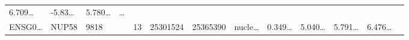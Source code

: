 \documentclass[
]{article}
\begin{document}
\begin{longtable}[]{@{}lllllllllllll@{}}
\begin{minipage}[t]{0.05\columnwidth}
6.709\ldots{}\strut
\end{minipage} & \begin{minipage}[t]{0.05\columnwidth}\raggedright
-5.83\ldots{}\strut
\end{minipage} & \begin{minipage}[t]{0.05\columnwidth}\raggedright
5.780\ldots{}\strut
\end{minipage} & \begin{minipage}[t]{0.02\columnwidth}\raggedright
\ldots{}\strut
\end{minipage}\tabularnewline
\begin{minipage}[t]{0.05\columnwidth}\raggedright
ENSG0\ldots{}\strut
\end{minipage} & \begin{minipage}[t]{0.05\columnwidth}\raggedright
NUP58\strut
\end{minipage} & \begin{minipage}[t]{0.05\columnwidth}\raggedright
9818\strut
\end{minipage} & \begin{minipage}[t]{0.05\columnwidth}\raggedright
\strut
\end{minipage} & \begin{minipage}[t]{0.05\columnwidth}\raggedright
13\strut
\end{minipage} & \begin{minipage}[t]{0.05\columnwidth}\raggedright
25301524\strut
\end{minipage} & \begin{minipage}[t]{0.05\columnwidth}\raggedright
25365390\strut
\end{minipage} & \begin{minipage}[t]{0.05\columnwidth}\raggedright
nucle\ldots{}\strut
\end{minipage} & \begin{minipage}[t]{0.05\columnwidth}\raggedright
0.349\ldots{}\strut
\end{minipage} & \begin{minipage}[t]{0.05\columnwidth}\raggedright
5.040\ldots{}\strut
\end{minipage} & \begin{minipage}[t]{0.05\columnwidth}\raggedright
5.791\ldots{}\strut
\end{minipage} & \begin{minipage}[t]{0.05\columnwidth}\raggedright
6.476\ldots{}\strut
\end{minipage} & \begin{minipage}[t]{0.02\columnwidth}\raggedright

\end{minipage}
\end{longtable}
\end{document}
